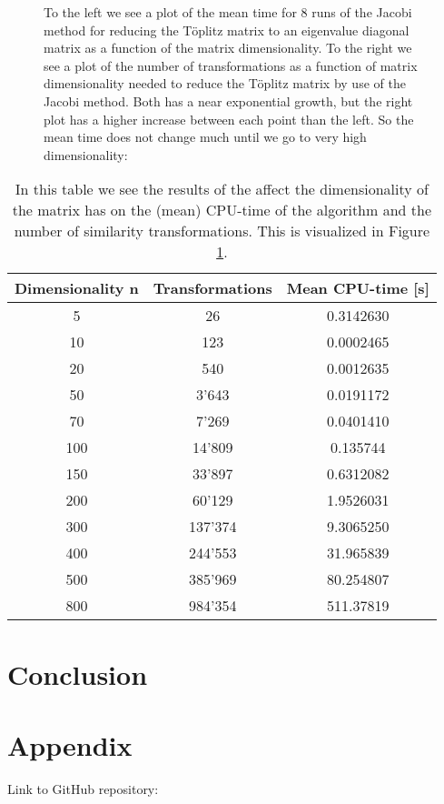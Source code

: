 \documentclass[12pt,a4paper,english]{article}
\begin{document}
\begin{figure}[htbp]
	\caption{To the left we see a plot of the mean time for 8 runs of the Jacobi method for reducing the Töplitz matrix to an eigenvalue diagonal matrix as a function of the matrix dimensionality. To the right we see a plot of the number of transformations as a function of matrix dimensionality needed to reduce the Töplitz matrix by use of the Jacobi method. Both has a near exponential growth, but the right plot has a higher increase between each point than the left. So the mean time does not change much until we go to very high dimensionality:\label{fig:time_transf}}
\end{figure}

\begin{table}[h!]
	\centering
	\begin{tabular}{ |c|c|c| }
		\hline \rule{0pt}{13pt}
		Dimensionality n & Transformations & Mean CPU-time [s] \\
		\hline \rule{0pt}{13pt}
		5 & 26 & 0.3142630 \\
		\hline \rule{0pt}{13pt}
		10 & 123 & 0.0002465 \\
		\hline \rule{0pt}{13pt}
		20 & 540 & 0.0012635 \\
		\hline \rule{0pt}{13pt}
		50 & 3'643 & 0.0191172 \\
		\hline \rule{0pt}{13pt}
		70 & 7'269 & 0.0401410 \\
		\hline \rule{0pt}{13pt}
		100 & 14'809 & 0.135744 \\
		\hline \rule{0pt}{13pt}
		150 & 33'897 & 0.6312082 \\
		\hline \rule{0pt}{13pt}
		200 & 60'129 & 1.9526031 \\
		\hline \rule{0pt}{13pt}
		300 & 137'374 & 9.3065250 \\
		\hline \rule{0pt}{13pt}
		400 & 244'553 & 31.965839 \\
		\hline \rule{0pt}{13pt}
		500 & 385'969 & 80.254807 \\
		\hline \rule{0pt}{13pt}
		800 & 984'354 & 511.37819 \\
		\hline
	\end{tabular}	
	\caption{In this table we see the results of the affect the dimensionality of the matrix has on the (mean) CPU-time of the algorithm and the number of similarity transformations. This is visualized in Figure \ref{fig:time_transf}.}
	\label{tab:ex_c}
\end{table}

\section{Conclusion}

\appendix
\section{Appendix}
\label{sect:appendix}
Link to GitHub repository:



\end{document}
